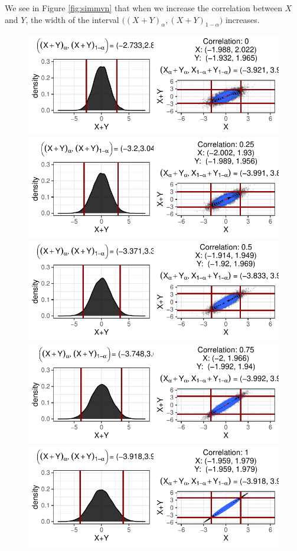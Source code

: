 \documentclass[12pt,twoside]{smiththesis}
\begin{document}
We see in Figure \ref{fig:simmvn} that when we increase the correlation between \(X\) and \(Y\), the width of the interval \(\Big((X+Y)_\alpha, (X+Y)_{1-\alpha}\Big)\) increases.
\begin{figure}

{\centering \includegraphics[width=0.96\linewidth]{thesis_files/figure-latex/unnamed-chunk-86-1} \includegraphics[width=0.96\linewidth]{thesis_files/figure-latex/unnamed-chunk-86-2} \includegraphics[width=0.96\linewidth]{thesis_files/figure-latex/unnamed-chunk-86-3} \includegraphics[width=0.96\linewidth]{thesis_files/figure-latex/unnamed-chunk-86-4} \includegraphics[width=0.96\linewidth]{thesis_files/figure-latex/unnamed-chunk-86-5} 

}
\end{figure}
\end{document}
